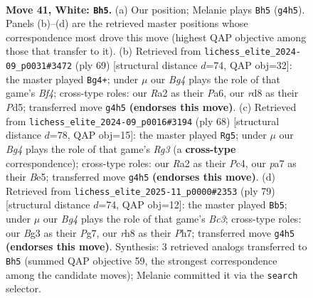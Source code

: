 \documentclass[11pt]{article}
\begin{document}
\clearpage

\begin{figure}[p]\centering
\begin{subfigure}{0.46\textwidth}\centering
\resizebox{\linewidth}{!}{%
\newchessgame
\chessboard[
  setfen={3r3r/p6p/5k1n/8/P5B1/1Pp1b1BP/R1P3PK/1R6 w - - 3 41},
  showmover=false,
  pgfstyle=straightmove, color=movearrow, markmove={g4-h5}
]}
\caption{}
\end{subfigure}\hfill
\begin{subfigure}{0.46\textwidth}\centering
\resizebox{\linewidth}{!}{%
\newchessgame
\chessboard[
  setfen={4r3/5pk1/p1p3p1/2Pp1b2/3Pp2B/6N1/8/3K1R2 b - - 5 35},
  showmover=false,
  pgfstyle=straightmove, color=movearrow, markmove={f5-g4}
]}
\caption{}
\end{subfigure}
\\[4pt]
\begin{subfigure}{0.46\textwidth}\centering
\resizebox{\linewidth}{!}{%
\newchessgame
\chessboard[
  setfen={4rk2/1p1r3p/n1p5/p3Bn2/2P2P2/P5RP/6BK/5R2 w - - 4 35},
  showmover=false,
  pgfstyle=straightmove, color=movearrow, markmove={g3-g5}
]}
\caption{}
\end{subfigure}\hfill
\begin{subfigure}{0.46\textwidth}\centering
\resizebox{\linewidth}{!}{%
\newchessgame
\chessboard[
  setfen={8/6pp/p1b1rpk1/4b3/1P2p1PP/4B3/5R2/2R3K1 b - - 0 40},
  showmover=false,
  pgfstyle=straightmove, color=movearrow, markmove={c6-b5}
]}
\caption{}
\end{subfigure}
\caption{\textbf{Move 41, White: \texttt{Bh5}.} (a) Our position; Melanie plays \texttt{Bh5} (\texttt{g4h5}). Panels (b)--(d) are the retrieved master positions whose correspondence most drove this move (highest QAP objective among those that transfer to it). (b) Retrieved from \texttt{lichess\_elite\_2024-09\_p0031\#3472} (ply 69) [structural distance $d$=74, QAP obj=32]: the master played \texttt{Bg4+}; under $\mu$ our \emph{Bg4} plays the role of that game's \emph{Bf4}; cross-type roles: our \emph{R}a2 as their \emph{P}a6, our \emph{r}d8 as their \emph{P}d5; transferred move \texttt{g4h5} \textbf{(endorses this move)}. (c) Retrieved from \texttt{lichess\_elite\_2024-09\_p0016\#3194} (ply 68) [structural distance $d$=78, QAP obj=15]: the master played \texttt{Rg5}; under $\mu$ our \emph{Bg4} plays the role of that game's \emph{Rg3} (a \textbf{cross-type} correspondence); cross-type roles: our \emph{R}a2 as their \emph{P}c4, our \emph{p}a7 as their \emph{B}e5; transferred move \texttt{g4h5} \textbf{(endorses this move)}. (d) Retrieved from \texttt{lichess\_elite\_2025-11\_p0000\#2353} (ply 79) [structural distance $d$=74, QAP obj=12]: the master played \texttt{Bb5}; under $\mu$ our \emph{Bg4} plays the role of that game's \emph{Bc3}; cross-type roles: our \emph{B}g3 as their \emph{P}g7, our \emph{r}h8 as their \emph{P}h7; transferred move \texttt{g4h5} \textbf{(endorses this move)}. Synthesis: 3 retrieved analogs transferred to \texttt{Bh5} (summed QAP objective 59, the strongest correspondence among the candidate moves); Melanie committed it via the \texttt{search} selector.}
\label{fig:thought-m80}
\end{figure}
\end{document}
